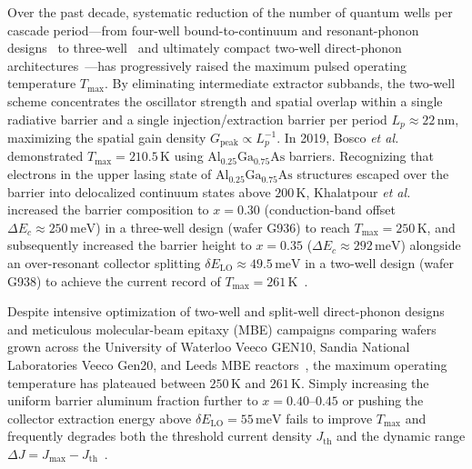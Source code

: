 \documentclass[11pt,letterpaper]{article}
\begin{document}
Over the past decade, systematic reduction of the number of quantum wells per cascade period---from four-well bound-to-continuum and resonant-phonon designs~\cite{Williams2005,Belkin2009} to three-well~\cite{Kumar2009,Fathololoumi2012} and ultimately compact two-well direct-phonon architectures~\cite{Scalari2010,Francki2019,Bosco2019}---has progressively raised the maximum pulsed operating temperature $T_{\max}$. By eliminating intermediate extractor subbands, the two-well scheme concentrates the oscillator strength and spatial overlap within a single radiative barrier and a single injection/extraction barrier per period $L_p \approx 22\,\mathrm{nm}$, maximizing the spatial gain density $G_{\mathrm{peak}} \propto L_p^{-1}$. In 2019, Bosco \textit{et al.}~\cite{Bosco2019} demonstrated $T_{\max} = 210.5\,\mathrm{K}$ using $\mathrm{Al}_{0.25}\mathrm{Ga}_{0.75}\mathrm{As}$ barriers. Recognizing that electrons in the upper lasing state of $\mathrm{Al}_{0.25}\mathrm{Ga}_{0.75}\mathrm{As}$ structures escaped over the barrier into delocalized continuum states above $200\,\mathrm{K}$, Khalatpour \textit{et al.}~\cite{Khalatpour2021} increased the barrier composition to $x = 0.30$ (conduction-band offset $\Delta E_c \approx 250\,\mathrm{meV}$) in a three-well design (wafer G936) to reach $T_{\max} = 250\,\mathrm{K}$, and subsequently increased the barrier height to $x = 0.35$ ($\Delta E_c \approx 292\,\mathrm{meV}$) alongside an over-resonant collector splitting $\delta E_{\mathrm{LO}} \approx 49.5\,\mathrm{meV}$ in a two-well design (wafer G938) to achieve the current record of $T_{\max} = 261\,\mathrm{K}$~\cite{Khalatpour2023}.

Despite intensive optimization of two-well and split-well direct-phonon designs~\cite{Albo2019,Sadeghi2023,Khalatpour2023} and meticulous molecular-beam epitaxy (MBE) campaigns comparing wafers grown across the University of Waterloo Veeco GEN10, Sandia National Laboratories Veeco Gen20, and Leeds MBE reactors~\cite{LiLinfieldRoadmap2025,KhalatpourRoadmap2025}, the maximum operating temperature has plateaued between $250\,\mathrm{K}$ and $261\,\mathrm{K}$. Simply increasing the uniform barrier aluminum fraction further to $x = 0.40\text{--}0.45$ or pushing the collector extraction energy above $\delta E_{\mathrm{LO}} = 55\,\mathrm{meV}$ fails to improve $T_{\max}$ and frequently degrades both the threshold current density $J_{\mathrm{th}}$ and the dynamic range $\Delta J = J_{\max} - J_{\mathrm{th}}$~\cite{KhalatpourRoadmap2025,JirauschekRoadmap2025}.
\end{document}
